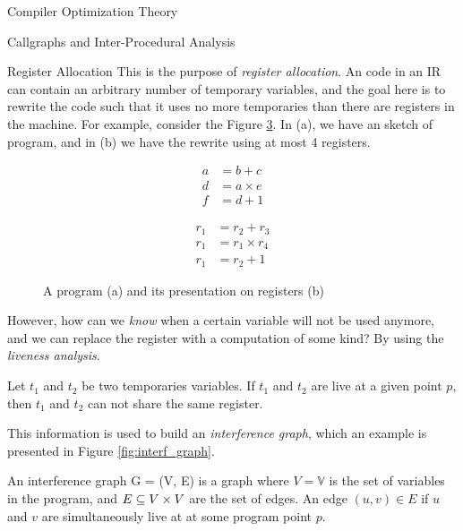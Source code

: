 \begin{section}{Compiler Optimization Theory}
\begin{section}{Callgraphs and Inter-Procedural Analysis}
\begin{subsection}{Register Allocation}
	This is the purpose of \textit{register allocation}. An code in an IR
	can contain an arbitrary number of temporary variables, and the goal
	here is to rewrite the code such that it uses no more temporaries
	than there are registers in the machine. For example, consider the
	Figure \ref{fig:register_ir}. In (a), we have an sketch of program,
	and in (b) we have the rewrite using at most 4 registers.

\begin{figure}[ht]
    \centering
    \begin{subfigure}[b]{0.40\textwidth}
		\begin{align}
			a &= b + c      \nonumber \\
			d &= a \times e \nonumber \\
			f &= d + 1      \nonumber
		\end{align}
        \caption{\label{fig:code_normal}}
    \end{subfigure}
    \begin{subfigure}[b]{0.40\textwidth}
		\begin{align}
			r_1 &= r_2 + r_3      \nonumber \\
			r_1 &= r_1 \times r_4 \nonumber \\
			r_1 &= r_2 + 1        \nonumber
		\end{align}
        \caption{\label{fig:code_register}}
\end{subfigure}
\caption{A program (a) and its presentation on registers (b)}
\label{fig:register_ir}
\end{figure}

	However, how can we \textit{know} when a certain variable will not
	be used anymore, and we can replace the register with a computation
	of some kind? By using the \textit{liveness analysis}.

\begin{definition}
	Let $t_1$ and $t_2$ be two temporaries variables. If $t_1$ and
	$t_2$ are live at a given point $p$, then $t_1$ and $t_2$ can not
	share the same register.
\end{definition}

This information is used to build an \textit{interference graph}, which an
example is presented in Figure \ref{fig:interf_graph}.

\begin{definition}
	An interference graph G = (V, E) is a graph where $V = \mathbb{V}$ is the
	set of variables in the program, and $E \subseteq V \times V$ are the set of
	edges. An edge $(u, v) \in E$ if $u$ and $v$ are simultaneously live at
	at some program point $p$.
\end{definition}


\end{subsection}
\end{section}
\end{section}
